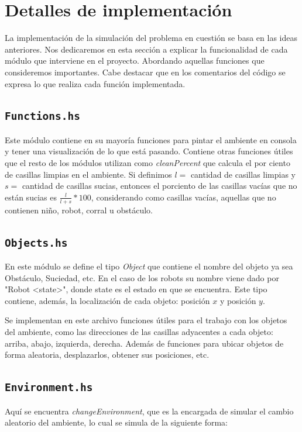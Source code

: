 \documentclass[twoside]{article}
\begin{document}
\section{Detalles de implementaci\'on}
La implementaci\'on de la simulaci\'on del problema en cuesti\'on se basa en las ideas anteriores. Nos dedicaremos en esta secci\'on a explicar la funcionalidad de cada m\'odulo que interviene en el proyecto. Abordando aquellas funciones que consideremos importantes. Cabe destacar que en los comentarios del c\'odigo se expresa lo que realiza cada funci\'on implementada.

\subsection{\texttt{Functions.hs}}
Este m\'odulo contiene en su mayor\'ia funciones para pintar el ambiente en consola y tener una visualizaci\'on de lo que est\'a pasando. Contiene otras funciones \'utiles que el resto de los m\'odulos utilizan como \textit{cleanPercent} que calcula el por ciento de casillas limpias en el ambiente. Si definimos $l =$ cantidad de casillas limpias y $s =$ cantidad de casillas sucias, entonces el porciento de las casillas vac\'ias que no est\'an sucias es $\frac{l}{l+s}*100$, considerando como casillas vac\'ias, aquellas que no contienen ni\~no, robot, corral u obst\'aculo.

\subsection{\texttt{Objects.hs}}
En este m\'odulo se define el tipo \textit{Object} que contiene el nombre del objeto ya sea Obst\'aculo, Suciedad, etc. En el caso de los robots su nombre viene dado por "Robot <state>", donde state es el estado en que se encuentra. Este tipo contiene, adem\'as, la localizaci\'on de cada objeto: posici\'on $x$ y posici\'on $y$.

Se implementan en este archivo funciones \'utiles para el trabajo con los objetos del ambiente, como las direcciones de las casillas adyacentes a cada objeto: arriba, abajo, izquierda, derecha. Adem\'as de funciones para ubicar objetos de forma aleatoria, desplazarlos, obtener sus posiciones, etc.

\subsection{\texttt{Environment.hs}}
Aqu\'i se encuentra \textit{changeEnvironment}, que es la encargada de simular el cambio aleatorio del ambiente, lo cual se simula de la siguiente forma: 
\end{document}
